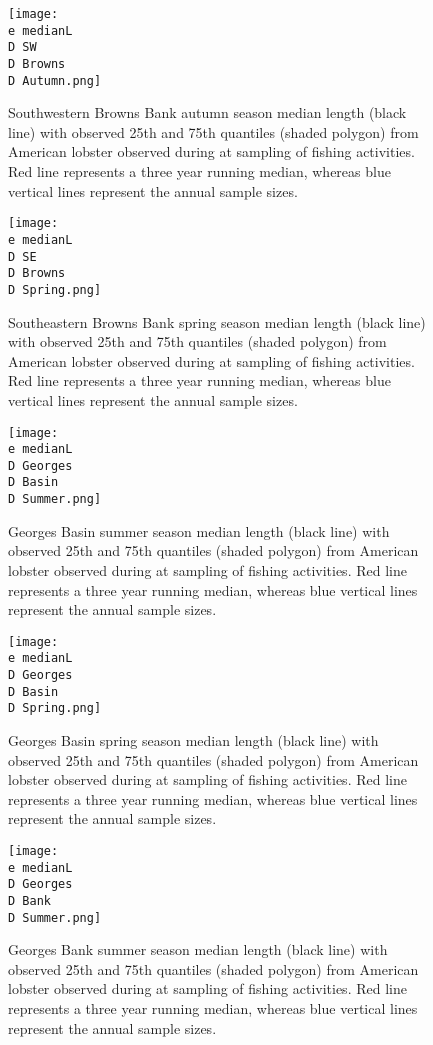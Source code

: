 \documentclass[11pt]{article}
\newcommand{\D}{.}
\newcommand{\e}{/backup/bio_data/bio.lobster/figures/} %
\begin{document}
\begin{figure}

    \texttt{[image: \\e medianL\\D SW\\D Browns\\D Autumn.png]}
    \caption{Southwestern Browns Bank autumn season median length (black line) with observed 25th and 75th quantiles (shaded polygon) from American lobster observed during at sampling of fishing activities. Red line represents a three year running median, whereas blue vertical lines represent the annual sample sizes.}

\end{figure}

\begin{figure}

    \texttt{[image: \\e medianL\\D SE\\D Browns\\D Spring.png]}
    \caption{Southeastern Browns Bank spring season median length (black line) with observed 25th and 75th quantiles (shaded polygon) from American lobster observed during at sampling of fishing activities. Red line represents a three year running median, whereas blue vertical lines represent the annual sample sizes.}

\end{figure}

\begin{figure}

    \texttt{[image: \\e medianL\\D Georges\\D Basin\\D Summer.png]}
    \caption{Georges Basin summer season median length (black line) with observed 25th and 75th quantiles (shaded polygon) from American lobster observed during at sampling of fishing activities. Red line represents a three year running median, whereas blue vertical lines represent the annual sample sizes.}

\end{figure}

\begin{figure}

    \texttt{[image: \\e medianL\\D Georges\\D Basin\\D Spring.png]}
    \caption{Georges Basin spring season median length (black line) with observed 25th and 75th quantiles (shaded polygon) from American lobster observed during at sampling of fishing activities. Red line represents a three year running median, whereas blue vertical lines represent the annual sample sizes.}

\end{figure}

\begin{figure}

    \texttt{[image: \\e medianL\\D Georges\\D Bank\\D Summer.png]}
    \caption{Georges Bank summer season median length (black line) with observed 25th and 75th quantiles (shaded polygon) from American lobster observed during at sampling of fishing activities. Red line represents a three year running median, whereas blue vertical lines represent the annual sample sizes.}

\end{figure}
\end{document}
